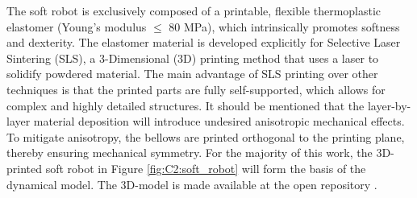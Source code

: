 \begin{rmk} The soft robot is exclusively composed of a printable, flexible thermoplastic elastomer (Young's modulus $\le$ 80 \si{\mega \pascal}), which intrinsically promotes softness and dexterity. The elastomer material is developed explicitly for Selective Laser Sintering (SLS), a 3-Dimensional (3D) printing method that uses a laser to solidify powdered material. The main advantage of SLS printing over other techniques is that the printed parts are fully self-supported, which allows for complex and highly detailed structures. It should be mentioned that the layer-by-layer material deposition will introduce undesired anisotropic mechanical effects. To mitigate anisotropy, the bellows are printed orthogonal to the printing plane, thereby ensuring mechanical symmetry. For the majority of this work, the 3D-printed soft robot in Figure \ref{fig:C2:soft_robot} will form the basis of the dynamical model. The 3D-model is made available at the open repository \cite{Caasenbrood2020}.
\end{rmk}
